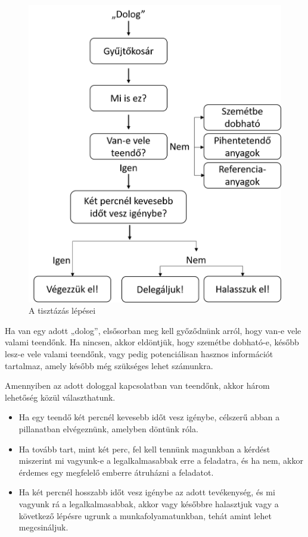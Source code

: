 \begin{figure}[h]
	\centering
	\includegraphics[scale=0.6]{images/tisztazas.png}
	\caption{A tisztázás lépései}
	\label{fig:tisztazas}
\end{figure}

Ha van egy adott „dolog”, elsősorban meg kell győződnünk arról, hogy van-e vele valami teendőnk. Ha nincsen, akkor eldöntjük, hogy szemétbe dobható-e, később lesz-e vele valami teendőnk, vagy pedig potenciálisan hasznos információt tartalmaz, amely később még szükséges lehet számunkra.

Amennyiben az adott dologgal kapcsolatban van teendőnk, akkor három lehetőség közül választhatunk.
\begin{itemize}
\item Ha egy teendő két percnél kevesebb időt vesz igénybe, célszerű abban a pillanatban elvégeznünk, amelyben döntünk róla.
\item Ha tovább tart, mint két perc, fel kell tennünk magunkban a kérdést miszerint mi vagyunk-e a legalkalmasabbak erre a feladatra, és ha nem, akkor érdemes egy megfelelő emberre átruházni a feladatot.
\item Ha két percnél hosszabb időt vesz igénybe az adott tevékenység, és mi vagyunk rá a legalkalmasabbak, akkor vagy későbbre halasztjuk vagy a következő lépésre ugrunk a munkafolyamatunkban, tehát amint lehet megcsináljuk.
\end{itemize}

